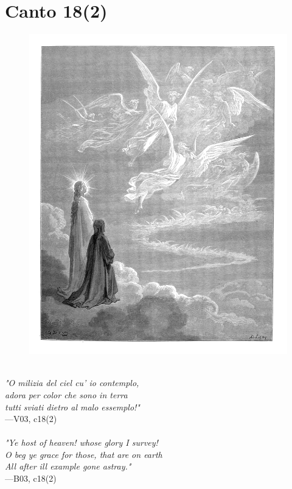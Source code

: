 \documentclass[../Dore_vision.tex]{subfiles}
\begin{document}
\newpage

\section{Canto 18(2)}

\begin{figure}[ht]
\centering
\includegraphics[height=\figsize]{illustrations/book_3/V03, c18(2).jpg}
\end{figure}

\begin{center}
\begin{minipage}{0.8\linewidth}
\textit{\\
"O milizia del ciel cu’ io contemplo,\\adora per color che sono in terra\\tutti sviati dietro al malo essemplo!"} \\
—V03, c18(2) \\~\\
\textit{"Ye host of heaven! whose glory I survey!\\O beg ye grace for those, that are on earth\\All after ill example gone astray."} \\
—B03, c18(2)
\end{minipage}
\end{center}
\end{document}
